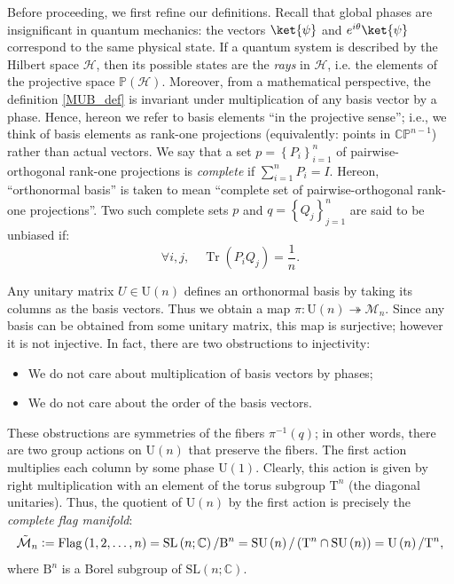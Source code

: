 \documentclass[referee,sn-mathphys-num]{sn-jnl}%
\theoremstyle{thmstyleone}%
\theoremstyle{thmstyletwo}%
\theoremstyle{remark}
\theoremstyle{thmstylethree}%
\DeclareMathOperator{\Tr}{Tr}
\newcommand{\defeq}{\vcentcolon=}
\begin{document}
Before proceeding, we first refine our definitions. Recall that global phases are insignificant in quantum mechanics: the vectors $ \ket{\psi} $ and $ e^{i \theta} \ket{\psi} $ correspond to the same physical state. If a quantum system is described by the Hilbert space $\mathcal{H} $, then its possible states are the \textit{rays} in $\mathcal{H} $, i.e. the elements of the projective space $ \mathbb{P} \left( \mathcal{H} \right) $. Moreover, from a mathematical perspective, the definition \eqref{MUB_def} is invariant under multiplication of any basis vector by a phase. Hence, hereon we refer to basis elements ``in the projective sense''; i.e., we think of basis elements as rank-one projections (equivalently: points in $\mathbb{CP}^{n-1}$) rather than actual vectors. We say that a set $ p = \left\{ P_i \right\}_{i=1}^n $ of pairwise-orthogonal rank-one projections is \textit{complete} if $ \sum_{i=1}^n P_i = I $. Hereon, ``orthonormal basis'' is taken to mean ``complete set of pairwise-orthogonal rank-one projections''.
Two such complete sets $ p $ and $ q = \left\{ Q_j \right\}_{j=1}^n $ are said to be unbiased if:
\begin{equation}
	\forall i,j, \quad \Tr \left( P_i Q_j \right) = \frac{1}{n} .
\end{equation}

Any unitary matrix $ U \in \mathrm{U}(n) $ defines an orthonormal basis by taking its columns as the basis vectors. Thus we obtain a map $ \pi : \mathrm{U}(n) \twoheadrightarrow \mathcal{M}_n $. Since any basis can be obtained from some unitary matrix, this map is surjective; however it is not injective. In fact, there are two obstructions to injectivity:
\begin{itemize}
	\item We do not care about multiplication of basis vectors by phases;
	\item We do not care about the order of the basis vectors.
\end{itemize}
These obstructions are symmetries of the fibers $ \pi^{-1} \left( q \right) $; in other words, there are two group actions on $\mathrm{U}(n) $ that preserve the fibers. 
The first action multiplies each column by some phase $ \mathrm{U}(1) $. 
Clearly, this action is given by right multiplication with an element of the torus subgroup $ \mathrm{T}^n $ (the diagonal unitaries). Thus, the quotient of $ \mathrm{U}(n) $ by the first action is precisely the \textit{complete flag manifold}:
\begin{equation}
	\tilde{\mathcal{M}}_n \defeq \mathrm{Flag} \left( 1, 2, \ldots, n \right) = \mathrm{SL} \left( n; \mathbb{C} \right) / \mathrm{B}^n = \mathrm{SU} \left( n \right) / \left( \mathrm{T}^n \cap \mathrm{SU} \left( n \right) \right) = \mathrm{U} \left( n \right) / \mathrm{T}^n ,
\end{equation}
where $ \mathrm{B}^n $ is a Borel subgroup of $ \mathrm{SL} \left( n; \mathbb{C} \right) $.
\end{document}
